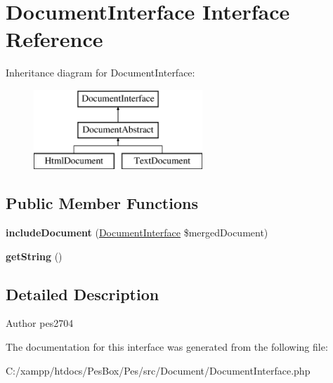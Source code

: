 \hypertarget{interface_pes_1_1_document_1_1_document_interface}{}\section{Document\+Interface Interface Reference}
\label{interface_pes_1_1_document_1_1_document_interface}
Inheritance diagram for Document\+Interface\+:\begin{figure}[H]
\begin{center}
\leavevmode
\includegraphics[height=3.000000cm]{interface_pes_1_1_document_1_1_document_interface}
\end{center}
\end{figure}
\subsection*{Public Member Functions}
\begin{DoxyCompactItemize}
\item 
\mbox{\label{interface_pes_1_1_document_1_1_document_interface_a02597c985e371ab672b78d34baf8d04e}} 
{\bfseries include\+Document} (\mbox{\hyperlink{interface_pes_1_1_document_1_1_document_interface}{Document\+Interface}} \$merged\+Document)
\item 
\mbox{\label{interface_pes_1_1_document_1_1_document_interface_afde980915cc78c408e6ac75b662e631c}} 
{\bfseries get\+String} ()
\end{DoxyCompactItemize}


\subsection{Detailed Description}
\begin{DoxyAuthor}{Author}
pes2704 
\end{DoxyAuthor}


The documentation for this interface was generated from the following file\+:\begin{DoxyCompactItemize}
\item 
C\+:/xampp/htdocs/\+Pes\+Box/\+Pes/src/\+Document/Document\+Interface.\+php\end{DoxyCompactItemize}
